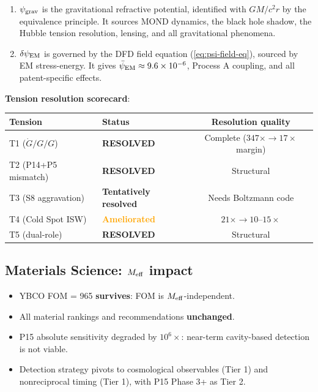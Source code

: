 \documentclass[11pt]{article}
\newcommand{\ee}[1]{\times 10^{#1}}
\newcommand{\psiEM}{\bar{\psi}_{\rm EM}}
\newcommand{\Gdot}{\dot{G}/G}
\begin{document}
\begin{enumerate}[nosep]
  \item $\psi_{\rm grav}$ is the gravitational refractive potential,
    identified with $GM/c^2r$ by the equivalence principle. It sources
    MOND dynamics, the black hole shadow, the Hubble tension resolution,
    lensing, and all gravitational phenomena.
  \item $\delta\psi_{\rm EM}$ is governed by the DFD field equation
    (\ref{eq:psi-field-eq}), sourced by EM stress-energy. It gives
    $\psiEM \approx 9.6\ee{-6}$, Process A coupling, and all
    patent-specific effects.
\end{enumerate}

\noindent\textbf{Tension resolution scorecard}:
\begin{center}
\begin{tabular}{llc}
\toprule
Tension & Status & Resolution quality \\
\midrule
T1 ($\Gdot/G$) & \textcolor{green!50!black}{\textbf{RESOLVED}} & Complete ($347\times \to 17\times$ margin) \\
T2 (P14+P5 mismatch) & \textcolor{green!50!black}{\textbf{RESOLVED}} & Structural \\
T3 (S8 aggravation) & \textcolor{green!50!black}{\textbf{Tentatively resolved}} & Needs Boltzmann code \\
T4 (Cold Spot ISW) & \textcolor{orange}{\textbf{Ameliorated}} & $21\times \to 10$--$15\times$ \\
T5 (dual-role) & \textcolor{green!50!black}{\textbf{RESOLVED}} & Structural \\
\bottomrule
\end{tabular}
\end{center}

\subsection{Materials Science: $M_{\rm eff}$ impact}

\begin{itemize}[nosep]
  \item YBCO FOM = 965 \textbf{survives}: FOM is $M_{\rm eff}$-independent.
  \item All material rankings and recommendations \textbf{unchanged}.
  \item P15 absolute sensitivity degraded by $10^6\times$: near-term
    cavity-based detection is not viable.
  \item Detection strategy pivots to cosmological observables (Tier 1)
    and nonreciprocal timing (Tier 1), with P15 Phase 3+ as Tier 2.
\end{itemize}
\end{document}
